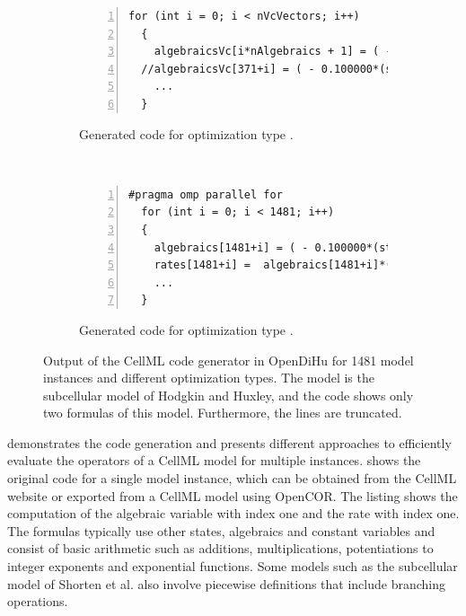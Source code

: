 \begin{figure}
\begin{subfigure}[t]{\textwidth}
\begin{framed}
\begin{lstlisting}[basicstyle=\footnotesize\ttfamily,commentstyle=\color{gray},numbers=left]
  for (int i = 0; i < nVcVectors; i++)
  {
    algebraicsVc[i*nAlgebraics + 1] = ( - 0.100000*(statesVc[i*nStates + 0]+50.000 $\label{alg:b_aovs}$
  //algebraicsVc[371+i] = ( - 0.100000*(statesVc[0+i]+50.0000))/(exponential(- (st $\label{alg:b_sova}$
    ...
  }
\end{lstlisting}
\end{framed}
    \caption{Generated code for optimization type .}%
    \label{fig:cellml_codes_vc}%
  \end{subfigure}\\[4mm]
  \begin{subfigure}[t]{\textwidth}%
  \centering%
\begin{framed}
\begin{lstlisting}[basicstyle=\footnotesize\ttfamily,commentstyle=\color{gray},numbers=left]
  #pragma omp parallel for
  for (int i = 0; i < 1481; i++)
  {
    algebraics[1481+i] = ( - 0.100000*(states[0+i]+50.0000))/(exp(- (states[0+i]+5
    rates[1481+i] =  algebraics[1481+i]*(1.00000 - states[1481+i]) -  algebraics[7
    ...
  }
\end{lstlisting}
\end{framed}
    \caption{Generated code for optimization type .}%
    \label{fig:cellml_codes_openmp}%
  \end{subfigure}
\caption{Output of the CellML code generator in OpenDiHu for 1481 model instances and different optimization types.  The model is the subcellular model of Hodgkin and Huxley, and the code shows only two formulas of this model. Furthermore, the lines are truncated.}%
\label{fig:cellml_codes}%
\end{figure}

 demonstrates the code generation and presents different approaches to efficiently evaluate the operators of a CellML model for multiple instances.  shows the original code for a single model instance, which can be obtained from the CellML website or exported from a CellML model using OpenCOR. The listing shows the computation of the algebraic variable with index one and the rate with index one. The formulas typically use other states, algebraics and constant variables and consist of basic arithmetic such as additions, multiplications, potentiations to integer exponents and exponential functions. Some models such as the subcellular model of Shorten et al. \cite{Shorten2007} also involve piecewise definitions that include  branching operations.

